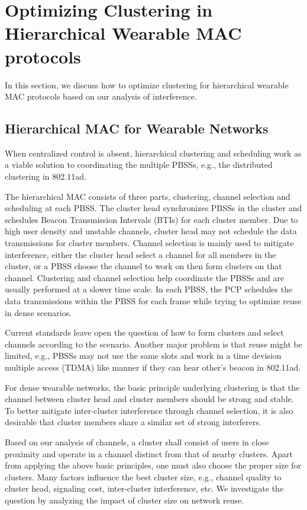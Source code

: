 \documentclass[10pt, conference, letterpaper]{IEEEtran}
\begin{document}
\section{Optimizing Clustering in Hierarchical Wearable MAC protocols}\label{section:clustering}
In this section, we discuss how to optimize clustering for hierarchical wearable MAC protocols based on our analysis of interference.

\subsection{Hierarchical MAC for Wearable Networks}\label{section:clustering:hierarchy}

When centralized control is absent, hierarchical clustering and scheduling work as a viable solution to coordinating the multiple PBSSs, e.g., the distributed clustering in 802.11ad. 


The hierarchical MAC consists of three parts, clustering, channel selection and scheduling at each PBSS. 
The cluster head synchronizes PBSSs in the cluster and schedules Beacon Transmission Intervals (BTIs) for each cluster member. 
Due to high user density and unstable channels, cluster head may not schedule the data transmissions for cluster members.
Channel selection is mainly used to mitigate interference, either the cluster head select a channel for all members in the cluster, or a PBSS choose the channel to work on then form clusters on that channel. 
Clustering and channel selection help coordinate the PBSSs and are usually performed at a slower time scale. 
In each PBSS, the PCP schedules the data transmissions within the PBSS for each frame while trying to optimize reuse in dense scenarios. 


Current standards leave open the question of how to form clusters and select channels according to the scenario. 
Another major problem is that reuse might be limited, e.g., PBSSs may not use the same slots and work in a time devision multiple access (TDMA) like manner if they can hear other's beacon in 802.11ad.


For dense wearable networks, the basic principle underlying clustering is that the channel between cluster head and cluster members should be strong and stable. 
To better mitigate inter-cluster interference through channel selection, it is also desirable that cluster members share a similar set of strong interferers. 

Based on our analysis of channels, a cluster shall consist of users in close proximity and operate in a channel distinct from that of nearby clusters. 
Apart from applying the above basic principles, one must also choose the proper size for clusters. 
Many factors influence the best cluster size, e.g., channel quality to cluster head, signaling cost, inter-cluster interference, etc. 
We investigate the question by analyzing the impact of cluster size on network reuse. 
\end{document}
